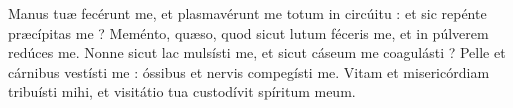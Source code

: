 
Manus tuæ fecérunt me, et plasmavérunt me totum in circúitu : et sic repénte præcípitas me ?
Meménto, quæso, quod sicut lutum féceris me, et in púlverem redúces me.
Nonne sicut lac mulsísti me, et sicut cáseum me coagulásti ?
Pelle et cárnibus vestísti me : óssibus et nervis compegísti me.
Vitam et misericórdiam tribuísti mihi, et visitátio tua custodívit spíritum meum.
